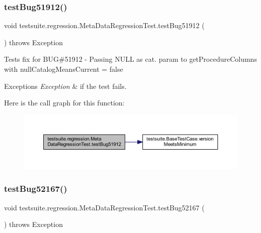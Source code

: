 \subsubsection{\texorpdfstring{test\+Bug51912()}{testBug51912()}}
{\footnotesize\ttfamily void testsuite.\+regression.\+Meta\+Data\+Regression\+Test.\+test\+Bug51912 (\begin{DoxyParamCaption}{ }\end{DoxyParamCaption}) throws Exception}

Tests fix for B\+UG\#51912 -\/ Passing N\+U\+LL as cat. param to get\+Procedure\+Columns with null\+Catalog\+Means\+Current = false


\begin{DoxyExceptions}{Exceptions}
{\em Exception} & if the test fails. \\
\hline
\end{DoxyExceptions}
Here is the call graph for this function\+:
\nopagebreak
\begin{figure}[H]
\begin{center}
\leavevmode
\includegraphics[width=350pt]{classtestsuite_1_1regression_1_1_meta_data_regression_test_a38cf409b423124090866e96e64226104_cgraph}
\end{center}
\end{figure}
\mbox{\label{classtestsuite_1_1regression_1_1_meta_data_regression_test_a9fe48a9548719aa95df0a85252333e6c}} 
\subsubsection{\texorpdfstring{test\+Bug52167()}{testBug52167()}}
{\footnotesize\ttfamily void testsuite.\+regression.\+Meta\+Data\+Regression\+Test.\+test\+Bug52167 (\begin{DoxyParamCaption}{ }\end{DoxyParamCaption}) throws Exception}

